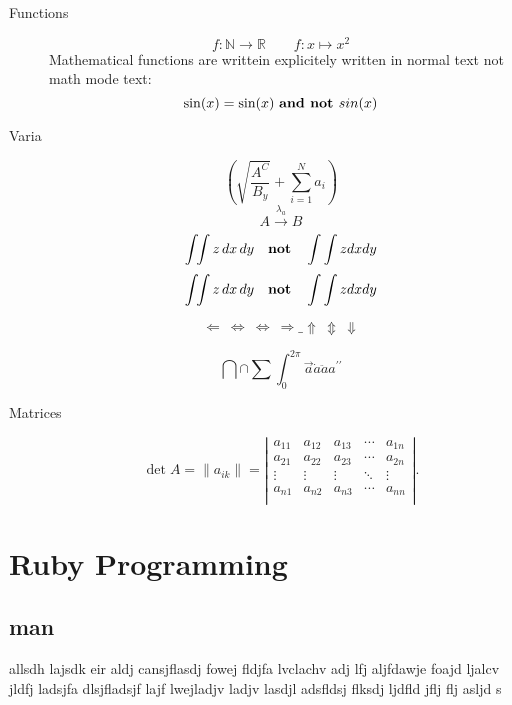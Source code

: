 \documentclass[10pt,a4paper]{scrartcl}
\begin{document}
\begin{description}
\item[Functions]
\[ f : \mathbb{N} \to \mathbb{R} \qquad f : x \mapsto x^2\]
Mathematical functions are writtein explicitely written in normal text not
math mode text:
\[ \sin(x) = \text{sin}(x) \text{ {\bf and not }} sin(x)\]

\item[Varia]
\[ \left( \sqrt{\frac{A^C}{B_y}} +	 \sum_{i=1}^N a_i\right) \]
\[ A \stackrel {\lambda_a} {\longrightarrow} B \]
\[ \int \! \! \int z\,dx \, dy \quad \mbox {\bf not} \quad \int\int z dx dy \]
\[ \int \! \! \int z\,dx \, dy \quad \mbox {\bf not} \quad \int\int z dx dy \]
				
{\Large
\[ \Leftarrow \  \Leftrightarrow \  \Longleftrightarrow \  \Rightarrow \_ 
    \Uparrow \  \Updownarrow \  \Downarrow	\]}
				
\[\bigcap \cap \sum \int_0^{2\pi} \vec{a} \dot{a} \ddot{a} a^{\prime \prime} \]


\item[Matrices]
\[ \det A = \| a_{ik} \| =
\left| \begin{array}{ccccc}
    a_{11} & a_{12} & a_{13} &  \cdots & a_{1n} \\
    a_{21} & a_{22} & a_{23} &  \cdots & a_{2n} \\
    \vdots  & \vdots  & \vdots  & \ddots & \vdots\\
    a_{n1} & a_{n2} & a_{n3} &  \cdots & a_{nn} \\
\end{array} \right| . \]

\end{description}

\section{Ruby Programming}
\subsection{man}
\begin{singlespacing}
allsdh lajsdk eir aldj cansjflasdj fowej fldjfa lvclachv adj lfj aljfdawje foajd ljalcv jldfj ladsjfa dlsjfladsjf lajf lwejladjv ladjv lasdjl adsfldsj flksdj ljdfld jflj flj asljd s
\end{singlespacing}
\newpage
\end{document}
